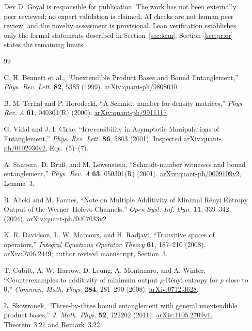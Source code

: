 \documentclass[11pt]{article}
\theoremstyle{definition}
\begin{document}
Dev D. Goyal is responsible for publication. The work has not been externally peer reviewed; no expert validation is claimed, AI checks are not human peer review, and the novelty assessment is provisional. Lean verification establishes only the formal statements described in Section~\ref{sec:lean}; Section~\ref{sec:prior} states the remaining limits.

\begin{thebibliography}{99}\small

C. H. Bennett et al., ``Unextendible Product Bases and Bound Entanglement,''
\emph{Phys. Rev. Lett.} \textbf{82}, 5385 (1999).
\href{https://arxiv.org/abs/quant-ph/9808030}{arXiv:quant-ph/9808030}.

B. M. Terhal and P. Horodecki, ``A Schmidt number for density matrices,''
\emph{Phys. Rev. A} \textbf{61}, 040301(R) (2000).
\href{https://arxiv.org/abs/quant-ph/9911117}{arXiv:quant-ph/9911117}.

G. Vidal and J. I. Cirac, ``Irreversibility in Asymptotic Manipulations of
Entanglement,'' \emph{Phys. Rev. Lett.} \textbf{86}, 5803 (2001).
Inspected \href{https://arxiv.org/abs/quant-ph/0102036v2}{arXiv:quant-ph/0102036v2},
Eqs.~(5)--(7).

A. Sanpera, D. Bru\ss, and M. Lewenstein, ``Schmidt-number witnesses and
bound entanglement,'' \emph{Phys. Rev. A} \textbf{63}, 050301(R) (2001).
\href{https://arxiv.org/abs/quant-ph/0009109v2}{arXiv:quant-ph/0009109v2}, Lemma~3.

R. Alicki and M. Fannes, ``Note on Multiple Additivity of Minimal R\'enyi
Entropy Output of the Werner--Holevo Channels,''
\emph{Open Syst. Inf. Dyn.} \textbf{11}, 339--342 (2004).
\href{https://arxiv.org/abs/quant-ph/0407033v2}{arXiv:quant-ph/0407033v2}.

K. R. Davidson, L. W. Marcoux, and H. Radjavi, ``Transitive spaces of
operators,'' \emph{Integral Equations Operator Theory} \textbf{61}, 187--210
(2008). \href{https://arxiv.org/abs/0706.2449}{arXiv:0706.2449};
author revised manuscript, Section~3.

T. Cubitt, A. W. Harrow, D. Leung, A. Montanaro, and A. Winter,
``Counterexamples to additivity of minimum output $p$-R\'enyi entropy for
$p$ close to 0,'' \emph{Commun. Math. Phys.} \textbf{284}, 281--290 (2008).
\href{https://arxiv.org/abs/0712.3628}{arXiv:0712.3628}.

\L. Skowronek, ``Three-by-three bound entanglement with general unextendible
product bases,'' \emph{J. Math. Phys.} \textbf{52}, 122202 (2011).
\href{https://arxiv.org/abs/1105.2709v1}{arXiv:1105.2709v1},
Theorem~3.21 and Remark~3.22.


\end{thebibliography}
\end{document}
